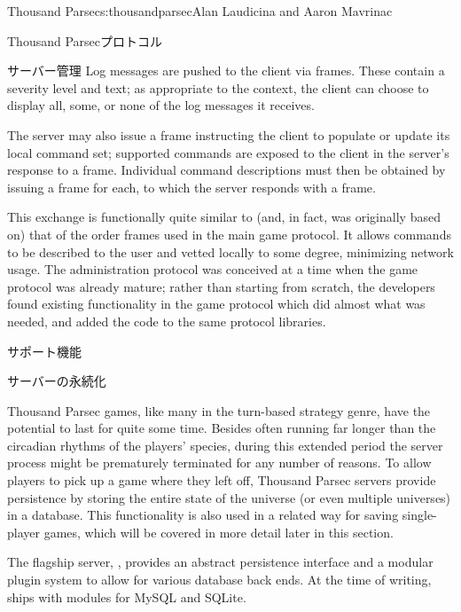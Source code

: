 \begin{aosachapter}{Thousand Parsec}{s:thousandparsec}{Alan Laudicina and Aaron Mavrinac}
\begin{aosasect1}{Thousand Parsecプロトコル}
\begin{aosasect2}{サーバー管理}
Log messages are pushed to the client via 
frames. These contain a severity level and text; as appropriate to the
context, the client can choose to display all, some, or none of the
log messages it receives.

The server may also issue a  frame instructing
the client to populate or update its local command set; supported
commands are exposed to the client in the server's response to a
 frame. Individual command
descriptions must then be obtained by issuing a  frame for each, to which the server responds with a
 frame.

This exchange is functionally quite similar to (and, in fact, was
originally based on) that of the order frames used in the main game
protocol. It allows commands to be described to the user and vetted
locally to some degree, minimizing network usage. The administration
protocol was conceived at a time when the game protocol was already
mature; rather than starting from scratch, the developers found
existing functionality in the game protocol which did almost what was
needed, and added the code to the same protocol libraries.

\end{aosasect2}

\end{aosasect1}

\begin{aosasect1}{サポート機能}

\begin{aosasect2}{サーバーの永続化}

Thousand Parsec games, like many in the turn-based strategy genre,
have the potential to last for quite some time. Besides often running
far longer than the circadian rhythms of the players' species, during
this extended period the server process might be prematurely
terminated for any number of reasons. To allow players to pick up a
game where they left off, Thousand Parsec servers provide persistence
by storing the entire state of the universe (or even multiple
universes) in a database. This functionality is also used in a related
way for saving single-player games, which will be covered in more
detail later in this section.

The flagship server, , provides an abstract
persistence interface and a modular plugin system to allow for various
database back ends. At the time of writing,  ships
with modules for MySQL and SQLite.


\end{aosasect2}
\end{aosasect1}
\end{aosachapter}
